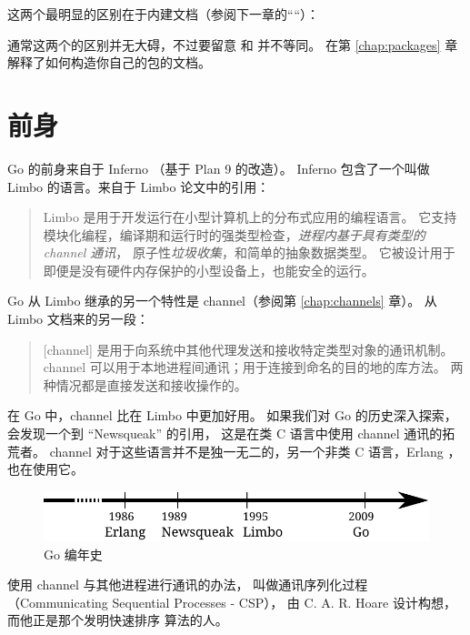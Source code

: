 这两个最明显的区别在于内建文档（参阅下一章的````）：
\begin{display}
\pr {}   
\pr {}    
\end{display}

通常这两个的区别并无大碍，不过要留意 
 和  并不等同。
在第 \ref{chap:packages} 章解释了如何构造你自己的包的文档。

\section{前身}
Go 的前身来自于 Inferno \cite{inferno} （基于 Plan 9 \cite{plan9} 的改造）。
Inferno 包含了一个叫做 Limbo \cite{limbo} 的语言。来自于 Limbo 论文中的引用：
\begin{quote}
Limbo 是用于开发运行在小型计算机上的分布式应用的编程语言。
它支持模块化编程，编译期和运行时的强类型检查，\emph{进程内基于具有类型的 channel 通讯}，
原子性\emph{垃圾收集}，和简单的抽象数据类型。
它被设计用于即便是没有硬件内存保护的小型设备上，也能安全的运行。
\end{quote}
Go 从 Limbo 继承的另一个特性是 channel（参阅第 \ref{chap:channels} 章）。
从 Limbo 文档来的另一段：
\begin{quote}
[channel] 是用于向系统中其他代理发送和接收特定类型对象的通讯机制。
channel 可以用于本地进程间通讯；用于连接到命名的目的地的库方法。
两种情况都是直接发送和接收操作的。
\end{quote}
在 Go 中，channel 比在 Limbo 中更加好用。
如果我们对 Go 的历史深入探索，会发现一个到 ``Newsqueak'' \cite{newsqueak} 的引用，
这是在类 C 语言中使用 channel 通讯的拓荒者。
channel 对于这些语言并不是独一无二的，另一个非类 C 语言，Erlang \cite{erlang}，也在使用它。

\begin{figure}[H]
\caption{Go 编年史}
\label{fig:chrono-of-go}
\begin{center}
\includegraphics[scale=0.65]{fig/go-history.pdf}
\end{center}
\end{figure}

使用 channel 与其他进程进行通讯的办法，
叫做通讯序列化过程（Communicating Sequential Processes - CSP），
由 C. A. R. Hoare \cite{hoare} 设计构想，而他正是那个发明快速排序 \cite{quicksort} 算法的人。

